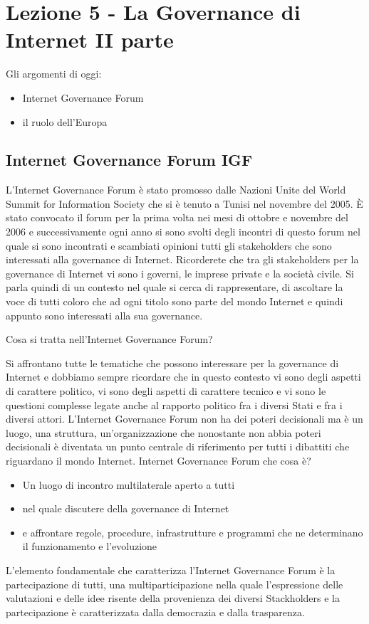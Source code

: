 \chapter{Lezione 5 - La Governance di Internet II parte}

Gli argomenti di oggi:

\begin{itemize}
    \item Internet Governance Forum
    \item il ruolo dell'Europa
\end{itemize} 

\section{Internet Governance Forum IGF}

L'Internet Governance Forum è stato promosso dalle Nazioni Unite del World Summit for Information Society che si è tenuto a Tunisi nel novembre del 2005. È stato convocato il forum per la prima volta nei mesi di ottobre e novembre del 2006 e successivamente ogni anno si sono svolti degli incontri di questo forum nel quale si sono incontrati e scambiati opinioni tutti gli stakeholders che sono interessati alla governance di Internet. Ricorderete che tra gli stakeholders per la governance di Internet vi sono i governi, le imprese private e la società civile. Si parla quindi di un contesto nel quale si cerca di rappresentare, di ascoltare la voce di tutti coloro che ad ogni titolo sono parte del mondo Internet e quindi appunto sono interessati alla sua governance. \par
Cosa si tratta nell'Internet Governance Forum?\par 
Si affrontano tutte le tematiche che possono interessare per la governance di Internet e dobbiamo sempre ricordare che in questo contesto vi sono degli aspetti di carattere politico, vi sono degli aspetti di carattere tecnico e vi sono le questioni complesse legate anche al rapporto politico fra i diversi Stati e fra i diversi attori. L'Internet Governance Forum non ha dei poteri decisionali ma è un luogo, una struttura, un'organizzazione che nonostante non abbia poteri decisionali è diventata un punto centrale di riferimento per tutti i dibattiti che riguardano il mondo Internet. 
Internet Governance Forum che cosa è?
\begin{itemize}
    \item Un luogo di incontro multilaterale aperto a tutti 
    \item nel quale discutere della governance di Internet 
    \item e affrontare regole, procedure, infrastrutture e programmi che ne determinano il funzionamento e l'evoluzione 
\end{itemize}
   L'elemento fondamentale che caratterizza l'Internet Governance Forum è la partecipazione di tutti, una multiparticipazione nella quale l'espressione delle valutazioni e delle idee risente della provenienza dei diversi Stackholders e la partecipazione è caratterizzata dalla democrazia e dalla trasparenza. \par
   

